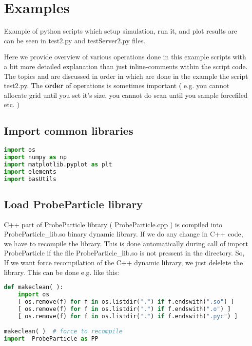 \section{Examples}
Example of python scripts which setup simulation, run it, and plot results are
can be seen in test2.py and testServer2.py files.

Here we provide overview of various operations done in this example scripts with
a bit more detailed explanation than just inline-comments within the script
code. The topics and are discussed in order in which are done in the example the
script test2.py. The \textbf{order} of operations is sometimes important ( e.g. you
cannot allocate grid until you set it's size, you cannot do scan until you
sample forcefiled etc. ) 


\subsection{Import common libraries}

\begin{shadedbox}
    \begin{lstlisting}[language=python]
import os
import numpy as np
import matplotlib.pyplot as plt
import elements
import basUtils
    \end{lstlisting}
\end{shadedbox}




\subsection{Load ProbeParticle library}

C++ part of ProbeParticle library ( ProbeParticle.cpp ) is compiled into
ProbeParticle\_lib.so binary dynamic library. If we do any change in C++ code, we
have to recompile the library. This is done automatically during call of import
ProbeParticle if the file ProbeParticle\_lib.so is not pressent in the directory.
So, If we want force recompilation of the C++ dynamic library, we just delelete
the library. This can be done e.g. like this: 


\begin{shadedbox}
    \begin{lstlisting}[language=python]
def makeclean( ):
    import os
    [ os.remove(f) for f in os.listdir(".") if f.endswith(".so") ]
    [ os.remove(f) for f in os.listdir(".") if f.endswith(".o") ]
    [ os.remove(f) for f in os.listdir(".") if f.endswith(".pyc") ]

makeclean( )  # force to recompile 
import  ProbeParticle as PP

    \end{lstlisting}
\end{shadedbox}



